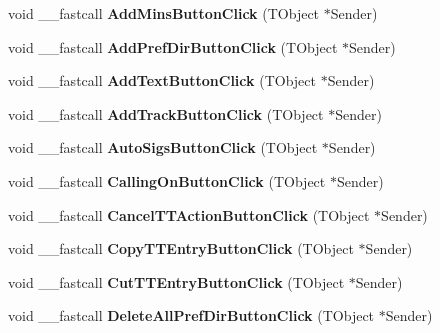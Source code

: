 \begin{DoxyCompactItemize}
\mbox{\label{class_t_interface_a30904d608111ce6452a9861d86b64267}} 
void \+\_\+\+\_\+fastcall {\bfseries Add\+Mins\+Button\+Click} (T\+Object $\ast$Sender)
\item 
\mbox{\label{class_t_interface_a1b1a4260e251c9bd5f48fd6c3432e7a5}} 
void \+\_\+\+\_\+fastcall {\bfseries Add\+Pref\+Dir\+Button\+Click} (T\+Object $\ast$Sender)
\item 
\mbox{\label{class_t_interface_aa20c05bf2d6c23035a10a89796334d0f}} 
void \+\_\+\+\_\+fastcall {\bfseries Add\+Text\+Button\+Click} (T\+Object $\ast$Sender)
\item 
\mbox{\label{class_t_interface_a10494e62a7bb4e7114ab4d98e18499f1}} 
void \+\_\+\+\_\+fastcall {\bfseries Add\+Track\+Button\+Click} (T\+Object $\ast$Sender)
\item 
\mbox{\label{class_t_interface_a36ad38f4b485bba874129aeb3a20d926}} 
void \+\_\+\+\_\+fastcall {\bfseries Auto\+Sigs\+Button\+Click} (T\+Object $\ast$Sender)
\item 
\mbox{\label{class_t_interface_ae758bf4183bb5aa2a7cd83e06acd89b6}} 
void \+\_\+\+\_\+fastcall {\bfseries Calling\+On\+Button\+Click} (T\+Object $\ast$Sender)
\item 
\mbox{\label{class_t_interface_af13bf97fa008045dbe3e6a05fbe962e2}} 
void \+\_\+\+\_\+fastcall {\bfseries Cancel\+T\+T\+Action\+Button\+Click} (T\+Object $\ast$Sender)
\item 
\mbox{\label{class_t_interface_adc0dd871fdd70ff11ada7a0ddd549e8e}} 
void \+\_\+\+\_\+fastcall {\bfseries Copy\+T\+T\+Entry\+Button\+Click} (T\+Object $\ast$Sender)
\item 
\mbox{\label{class_t_interface_acd41ae8fa5d16248a867472d9c8ae646}} 
void \+\_\+\+\_\+fastcall {\bfseries Cut\+T\+T\+Entry\+Button\+Click} (T\+Object $\ast$Sender)
\item 
\mbox{\label{class_t_interface_af9cb95043f5276df55cb6809e104c93a}} 
void \+\_\+\+\_\+fastcall {\bfseries Delete\+All\+Pref\+Dir\+Button\+Click} (T\+Object $\ast$Sender)

\end{DoxyCompactItemize}
